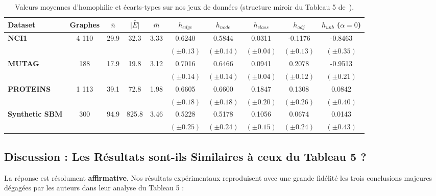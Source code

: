 \documentclass[11pt,a4paper]{article}
\begin{document}
\begin{table}[htbp]
\centering
\caption{Valeurs moyennes d'homophilie et écarts-types sur nos jeux de données (structure miroir du Tableau 5 de~\cite{mironov2024revisiting}).}
\label{tab:table_5_comparison}
\small
\begin{tabularx}{\textwidth}{l c c c c c c c c c}
\toprule
\textbf{Dataset} & \textbf{Graphes} & $\bar{n}$ & $\bar{|E|}$ & $\bar{m}$ & $h_{edge}$ & $h_{node}$ & $h_{class}$ & $h_{adj}$ & $h_{unb}$ ($\alpha=0$) \\
\midrule
\textbf{NCI1}           & 4 110 & 29.9 & 32.3  & 3.33 & 0.6240 & 0.5844 & 0.0311 & -0.1176 & -0.8463 \\
                        &       &      &       &      & {\scriptsize $(\pm 0.13)$} & {\scriptsize $(\pm 0.14)$} & {\scriptsize $(\pm 0.04)$} & {\scriptsize $(\pm 0.13)$} & {\scriptsize $(\pm 0.35)$} \\
\textbf{MUTAG}          & 188   & 17.9 & 19.8  & 3.12 & 0.7016 & 0.6466 & 0.0941 & 0.2078  & -0.9513 \\
                        &       &      &       &      & {\scriptsize $(\pm 0.14)$} & {\scriptsize $(\pm 0.14)$} & {\scriptsize $(\pm 0.04)$} & {\scriptsize $(\pm 0.12)$} & {\scriptsize $(\pm 0.21)$} \\
\textbf{PROTEINS}       & 1 113 & 39.1 & 72.8  & 1.98 & 0.6605 & 0.6600 & 0.1847 & 0.1308  & 0.0842  \\
                        &       &      &       &      & {\scriptsize $(\pm 0.18)$} & {\scriptsize $(\pm 0.18)$} & {\scriptsize $(\pm 0.20)$} & {\scriptsize $(\pm 0.26)$} & {\scriptsize $(\pm 0.40)$} \\
\textbf{Synthetic SBM}  & 300   & 94.9 & 825.8 & 3.46 & 0.5228 & 0.5178 & 0.1056 & 0.0674  & 0.0143  \\
                        &       &      &       &      & {\scriptsize $(\pm 0.25)$} & {\scriptsize $(\pm 0.24)$} & {\scriptsize $(\pm 0.15)$} & {\scriptsize $(\pm 0.24)$} & {\scriptsize $(\pm 0.43)$} \\
\bottomrule
\end{tabularx}
\end{table}

\subsection{Discussion : Les Résultats sont-ils Similaires à ceux du Tableau 5 ?}

La réponse est résolument \textbf{affirmative}. Nos résultats expérimentaux reproduisent avec une grande fidélité les trois conclusions majeures dégagées par les auteurs dans leur analyse du Tableau 5 :
\end{document}

